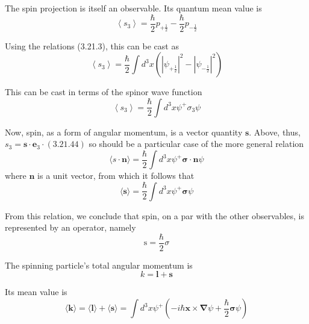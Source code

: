 \documentclass{article}
\begin{document}
The spin projection is itself an observable. Its quantum mean value is
$$
\begin{equation*}
\left\langle s_{3}\right\rangle=\frac{\hbar}{2} p_{+\frac{1}{2}}-\frac{\hbar}{2} p_{-\frac{1}{2}} \tag{3.21.42}
\end{equation*}
$$

Using the relations (3.21.3), this can be cast as
$$
\begin{equation*}
\left\langle s_{3}\right\rangle=\frac{\hbar}{2} \int d^{3} x\left(\left|\psi_{+\frac{1}{2}}\right|^{2}-\left|\psi_{-\frac{1}{2}}\right|^{2}\right) \tag{3.21.43}
\end{equation*}
$$

This can be cast in terms of the spinor wave function
$$
\begin{equation*}
\left\langle s_{3}\right\rangle=\frac{\hbar}{2} \int d^{3} x \psi^{+} \sigma_{3} \psi \tag{3.21.44}
\end{equation*}
$$

Now, spin, as a form of angular momentum, is a vector quantity $\boldsymbol{s}$. Above, thus, $s_{3}=\boldsymbol{s} \cdot \boldsymbol{e}_{3} \cdot(3.21 .44)$ so should be a particular case of the more general relation
$$
\begin{equation*}
\langle s \cdot \boldsymbol{n}\rangle=\frac{\hbar}{2} \int d^{3} x \psi^{+} \boldsymbol{\sigma} \cdot \boldsymbol{n} \psi \tag{3.21.45}
\end{equation*}
$$
where $\boldsymbol{n}$ is a unit vector, from which it follows that
$$
\begin{equation*}
\langle\boldsymbol{s}\rangle=\frac{\hbar}{2} \int d^{3} x \psi^{+} \boldsymbol{\sigma} \psi \tag{3.21.46}
\end{equation*}
$$

From this relation, we conclude that spin, on a par with the other observables, is represented by an operator, namely
$$
\begin{equation*}
\mathrm{s}=\frac{\hbar}{2} \sigma \tag{3.21.47}
\end{equation*}
$$

The spinning particle's total angular momentum is
$$
\begin{equation*}
k=\boldsymbol{l}+\boldsymbol{s} \tag{3.21.48}
\end{equation*}
$$

Its mean value is
$$
\begin{equation*}
\langle\boldsymbol{k}\rangle=\langle\boldsymbol{l}\rangle+\langle\boldsymbol{s}\rangle=\int d^{3} x \psi^{+}\left(-i \hbar \boldsymbol{x} \times \boldsymbol{\nabla} \psi+\frac{\hbar}{2} \boldsymbol{\sigma} \psi\right) \tag{3.21.49}
\end{equation*}
$$
\end{document}
